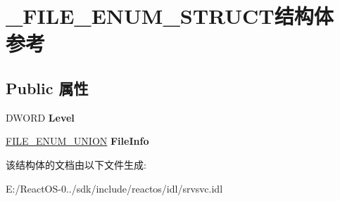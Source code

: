 \hypertarget{struct___f_i_l_e___e_n_u_m___s_t_r_u_c_t}{}\section{\+\_\+\+F\+I\+L\+E\+\_\+\+E\+N\+U\+M\+\_\+\+S\+T\+R\+U\+C\+T结构体 参考}
\label{struct___f_i_l_e___e_n_u_m___s_t_r_u_c_t}
\subsection*{Public 属性}
\begin{DoxyCompactItemize}
\item 
\mbox{\label{struct___f_i_l_e___e_n_u_m___s_t_r_u_c_t_ac00b1693464a362f2339b68e8b321192}} 
D\+W\+O\+RD {\bfseries Level}
\item 
\mbox{\label{struct___f_i_l_e___e_n_u_m___s_t_r_u_c_t_a76a9e139a86bf9ab742c1070daa4eb96}} 
\hyperlink{union___f_i_l_e___e_n_u_m___u_n_i_o_n}{F\+I\+L\+E\+\_\+\+E\+N\+U\+M\+\_\+\+U\+N\+I\+ON} {\bfseries File\+Info}
\end{DoxyCompactItemize}


该结构体的文档由以下文件生成\+:\begin{DoxyCompactItemize}
\item 
E\+:/\+React\+O\+S-\/0../sdk/include/reactos/idl/srvsvc.\+idl\end{DoxyCompactItemize}

